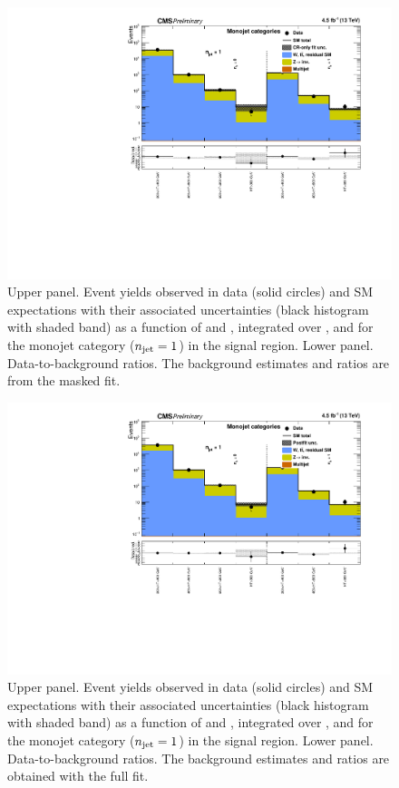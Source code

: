 \clearpage
\begin{figure}[h!]
  \centering
  \caption{Upper panel. Event yields observed in data (solid circles)
    and SM expectations with their associated uncertainties (black
    histogram with shaded band) as a function of \nb and \scalht,
    integrated over \mht, and for the monojet category ($n_{\text{jet}} = 1$)
    in the signal region. Lower panel. Data-to-background ratios. The
    background estimates and ratios are from the masked fit. }
  \label{fig:mr_mono_pre}
  \includegraphics[width=1.\linewidth]{figures/results/mono/summaryPlot_Monojet_prefit}
\end{figure}

\clearpage
\begin{figure}[h!]
  \centering
  \caption{Upper panel. Event yields observed in data (solid circles)
    and SM expectations with their associated uncertainties (black
    histogram with shaded band) as a function of \nb and \scalht,
    integrated over \mht, and for the monojet category ($n_{\text{jet}} = 1$)
    in the signal region. Lower panel. Data-to-background ratios. The
    background estimates and ratios are obtained with the full fit. }
  \label{fig:mr_mono_post}
  \includegraphics[width=1.\linewidth]{figures/results/mono/summaryPlot_Monojet_fit_b}
\end{figure}

